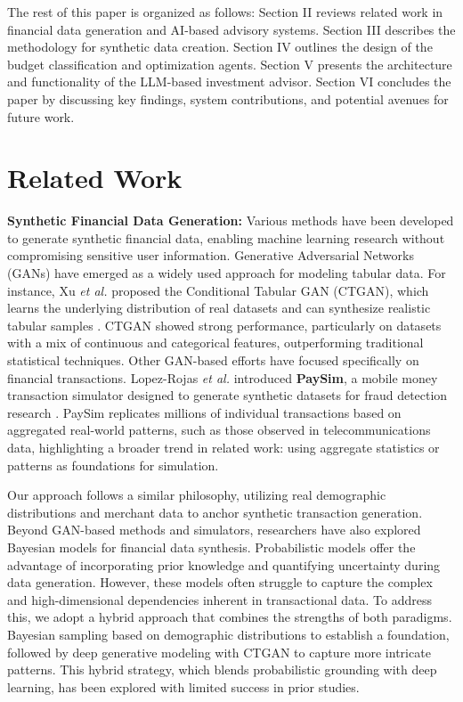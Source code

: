\documentclass[conference]{IEEEtran}
\begin{document}
The rest of this paper is organized as follows: Section II reviews related work in financial data generation and AI-based advisory systems. Section III describes the methodology for synthetic data creation. Section IV outlines the design of the budget classification and optimization agents. Section V presents the architecture and functionality of the LLM-based investment advisor. Section VI concludes the paper by discussing key findings, system contributions, and potential avenues for future work.

\section{Related Work}

\textbf{Synthetic Financial Data Generation:}  
Various methods have been developed to generate synthetic financial data, enabling machine learning research without compromising sensitive user information. Generative Adversarial Networks (GANs) have emerged as a widely used approach for modeling tabular data. For instance, Xu \textit{et al.} proposed the Conditional Tabular GAN (CTGAN), which learns the underlying distribution of real datasets and can synthesize realistic tabular samples \cite{b1}. CTGAN showed strong performance, particularly on datasets with a mix of continuous and categorical features, outperforming traditional statistical techniques. Other GAN-based efforts have focused specifically on financial transactions. Lopez-Rojas \textit{et al.} introduced \textbf{PaySim}, a mobile money transaction simulator designed to generate synthetic datasets for fraud detection research \cite{b2}. PaySim replicates millions of individual transactions based on aggregated real-world patterns, such as those observed in telecommunications data, highlighting a broader trend in related work: using aggregate statistics or patterns as foundations for simulation.

Our approach follows a similar philosophy, utilizing real demographic distributions and merchant data to anchor synthetic transaction generation. Beyond GAN-based methods and simulators, researchers have also explored Bayesian models for financial data synthesis. Probabilistic models offer the advantage of incorporating prior knowledge and quantifying uncertainty during data generation. However, these models often struggle to capture the complex and high-dimensional dependencies inherent in transactional data. To address this, we adopt a hybrid approach that combines the strengths of both paradigms. Bayesian sampling based on demographic distributions to establish a foundation, followed by deep generative modeling with CTGAN to capture more intricate patterns. This hybrid strategy, which blends probabilistic grounding with deep learning, has been explored with limited success in prior studies.
\end{document}
